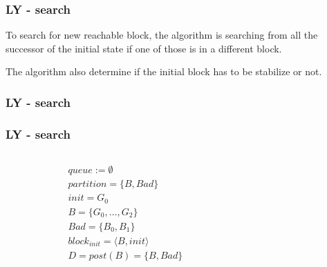 \documentclass[11pt,handout]{beamer}
\begin{document}
\begin{frame}
  \frametitle{LY - search}
  To search for new reachable block, the algorithm is searching from all the
  successor of the initial state if one of those is in a different block.

  \pause
  \vspace*{1cm}

  The algorithm also determine if the initial block has to be stabilize or not.
\end{frame}

\begin{frame}[fragile]
  \frametitle{LY - search}
  \begin{algorithmic}
    \EndIf
     
    \EndIf
    \EndFor
     
    \EndIf
  \end{algorithmic}
\end{frame}

\begin{frame}[fragile]
  \frametitle{LY - search}
  \begin{columns}
    \begin{column}{0.5\textwidth}
      \begin{align*}
        & queue := \emptyset \\
        & partition = \{B, Bad\} \\
        & init = G_0 \\
        & B = \{G_0,\dots,G_2\}\\
        & Bad = \{B_0,B_1\} \\
        & block_{init} = \langle B,init \rangle \\
        & D = post(B) = \{ B,Bad \}
      \end{align*}
    \end{column}
    \begin{column}{0.5\textwidth}%
      
    \end{column}
  \end{columns}
\end{frame}
  
\end{document}
